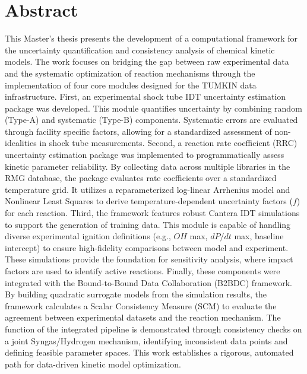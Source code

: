 \chapter*{Abstract}
\label{Chap:Abstract}
This Master’s thesis presents the development of a computational framework for the uncertainty quantification and consistency analysis of chemical kinetic models. The work focuses on bridging the gap between raw experimental data and the systematic optimization of reaction mechanisms through the implementation of four core modules designed for the TUMKIN data infrastructure. First, an experimental shock tube IDT uncertainty estimation package was developed. This module quantifies uncertainty by combining random (Type-A) and systematic (Type-B) components. Systematic errors are evaluated through facility specific factors, allowing for a standardized assessment of non-idealities in shock tube measurements. Second, a reaction rate coefficient (RRC) uncertainty estimation package was implemented to programmatically assess kinetic parameter reliability. By collecting data across multiple libraries in the RMG database, the package evaluates rate coefficients over a standardized temperature grid. It utilizes a reparameterized log-linear Arrhenius model and Nonlinear Least Squares to derive temperature-dependent uncertainty factors ($f$) for each reaction. Third, the framework features robust Cantera IDT simulations to support the generation of training data. This module is capable of handling diverse experimental ignition definitions (e.g., $OH$ max, $dP/dt$ max, baseline intercept) to ensure high-fidelity comparisons between model and experiment. These simulations provide the foundation for sensitivity analysis, where impact factors are used to identify active reactions. Finally, these components were integrated with the Bound-to-Bound Data Collaboration (B2BDC) framework. By building quadratic surrogate models from the simulation results, the framework calculates a Scalar Consistency Measure (SCM) to evaluate the agreement between experimental datasets and the reaction mechanism. The function of the integrated pipeline is demonstrated through consistency checks on a joint Syngas/Hydrogen mechanism, identifying inconsistent data points and defining feasible parameter spaces. This work establishes a rigorous, automated path for data-driven kinetic model optimization.